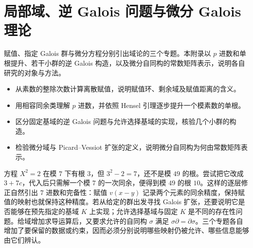 
\chapter{局部域、逆 Galois 问题与微分 Galois 理论}
\label{b1:app:D}

\begin{chapterabstract}
	赋值、指定 Galois 群与微分方程分别引出域论的三个专题。本附录以 \(p\) 进数和单根提升、若干小群的逆 Galois 构造，以及微分自同构的常数矩阵表示，说明各自研究的对象与方法。
\end{chapterabstract}

\begin{learninggoals}
	\begin{itemize}
		\item 从素数的整除次数计算离散赋值，说明赋值环、剩余域及赋值距离的含义。
		\item 用相容同余类理解 \(p\) 进数，并依照 Hensel 引理逐步提升一个模素数的单根。
		\item 区分固定基域的逆 Galois 问题与允许选择基域的实现，核验几个小群的构造。
		\item 检验微分域与 Picard--Vessiot 扩张的定义，说明微分自同构为何由常数矩阵表示。
	\end{itemize}

\end{learninggoals}

方程 \(X^2=2\) 在模 \(7\) 下有根 \(3\)，但 \(3^2-2=7\)，还不是模 \(49\) 的根。尝试把它改成 \(3+7c\)，代入后只需解一个模 \(7\) 的一次同余，便得到模 \(49\) 的根 \(10\)。这样的逐层修正自然引出 \(7\) 进数和完备性：赋值 \(v(x-y)\) 记录两个元素的同余精度，保持赋值的映射也就保持这种精度。若从给定的群出发寻找 Galois 扩张，还要说明它是否能够在预先指定的基域 \(K\) 上实现；允许选择基域与固定 \(K\) 是不同的存在性问题。给域增加求导运算后，又要求允许的自同构 \(\sigma\) 满足 \(\sigma\partial=\partial\sigma\)。三个专题各自增加了要保留的数据或约束，因而必须分别说明哪些映射仍被允许、哪些信息能够由它们辨认。

